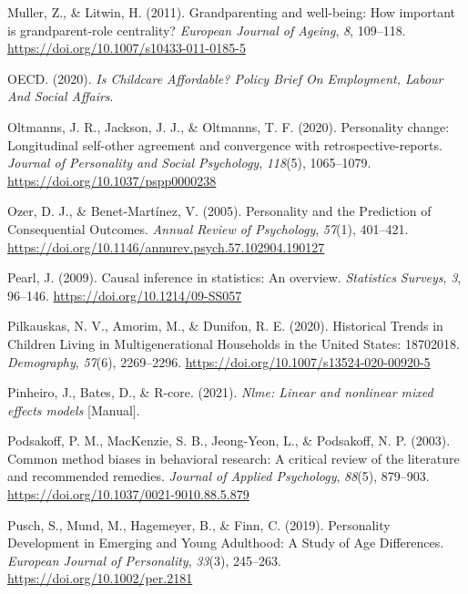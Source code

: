 \documentclass[
  english,
  man, noextraspace]{apa7}
\begin{document}
\leavevmode\hypertarget{ref-mullerGrandparentingWellbeingHow2011}{}%
Muller, Z., \& Litwin, H. (2011). Grandparenting and well-being: How important is grandparent-role centrality? \emph{European Journal of Ageing}, \emph{8}, 109--118. \url{https://doi.org/10.1007/s10433-011-0185-5}

\leavevmode\hypertarget{ref-oecdChildcareAffordablePolicy2020}{}%
OECD. (2020). \emph{Is Childcare Affordable? Policy Brief On Employment, Labour And Social Affairs}.

\leavevmode\hypertarget{ref-oltmannsPersonalityChangeLongitudinal2020}{}%
Oltmanns, J. R., Jackson, J. J., \& Oltmanns, T. F. (2020). Personality change: Longitudinal self-other agreement and convergence with retrospective-reports. \emph{Journal of Personality and Social Psychology}, \emph{118}(5), 1065--1079. \url{https://doi.org/10.1037/pspp0000238}

\leavevmode\hypertarget{ref-ozerPersonalityPredictionConsequential2005}{}%
Ozer, D. J., \& Benet-Martínez, V. (2005). Personality and the Prediction of Consequential Outcomes. \emph{Annual Review of Psychology}, \emph{57}(1), 401--421. \url{https://doi.org/10.1146/annurev.psych.57.102904.190127}

\leavevmode\hypertarget{ref-pearlCausalInferenceStatistics2009}{}%
Pearl, J. (2009). Causal inference in statistics: An overview. \emph{Statistics Surveys}, \emph{3}, 96--146. \url{https://doi.org/10.1214/09-SS057}

\leavevmode\hypertarget{ref-pilkauskasHistoricalTrendsChildren2020}{}%
Pilkauskas, N. V., Amorim, M., \& Dunifon, R. E. (2020). Historical Trends in Children Living in Multigenerational Households in the United States: 18702018. \emph{Demography}, \emph{57}(6), 2269--2296. \url{https://doi.org/10.1007/s13524-020-00920-5}

\leavevmode\hypertarget{ref-R-nlme}{}%
Pinheiro, J., Bates, D., \& R-core. (2021). \emph{Nlme: Linear and nonlinear mixed effects models} {[}Manual{]}.

\leavevmode\hypertarget{ref-podsakoffCommonMethodBiases2003}{}%
Podsakoff, P. M., MacKenzie, S. B., Jeong-Yeon, L., \& Podsakoff, N. P. (2003). Common method biases in behavioral research: A critical review of the literature and recommended remedies. \emph{Journal of Applied Psychology}, \emph{88}(5), 879--903. \url{https://doi.org/10.1037/0021-9010.88.5.879}

\leavevmode\hypertarget{ref-puschPersonalityDevelopmentEmerging2019}{}%
Pusch, S., Mund, M., Hagemeyer, B., \& Finn, C. (2019). Personality Development in Emerging and Young Adulthood: A Study of Age Differences. \emph{European Journal of Personality}, \emph{33}(3), 245--263. \url{https://doi.org/10.1002/per.2181}
\end{document}
